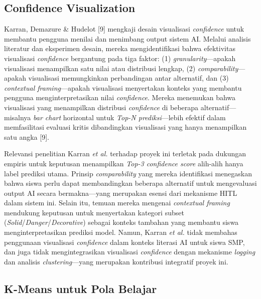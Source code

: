\documentclass[12pt,oneside]{report}
\begin{document}
\subsection{Confidence Visualization}
\label{subsec:penelitian-confidence-vis}

Karran, Demazure \& Hudelot [9] mengkaji desain visualisasi \textit{confidence} untuk membantu pengguna menilai dan menimbang output sistem AI. Melalui analisis literatur dan eksperimen desain, mereka mengidentifikasi bahwa efektivitas visualisasi \textit{confidence} bergantung pada tiga faktor: (1) \textit{granularity}—apakah visualisasi menampilkan satu nilai atau distribusi lengkap, (2) \textit{comparability}—apakah visualisasi memungkinkan perbandingan antar alternatif, dan (3) \textit{contextual framing}—apakah visualisasi menyertakan konteks yang membantu pengguna menginterpretasikan nilai \textit{confidence}. Mereka menemukan bahwa visualisasi yang menampilkan distribusi \textit{confidence} di beberapa alternatif—misalnya \textit{bar chart} horizontal untuk \textit{Top-N prediksi}—lebih efektif dalam memfasilitasi evaluasi kritis dibandingkan visualisasi yang hanya menampilkan satu angka [9].

Relevansi penelitian Karran \textit{et al.} terhadap proyek ini terletak pada dukungan empiris untuk keputusan menampilkan \textit{Top-3 confidence score} alih-alih hanya label prediksi utama. Prinsip \textit{comparability} yang mereka identifikasi menegaskan bahwa siswa perlu dapat membandingkan beberapa alternatif untuk mengevaluasi output AI secara bermakna—yang merupakan esensi dari mekanisme HITL dalam sistem ini. Selain itu, temuan mereka mengenai \textit{contextual framing} mendukung keputusan untuk menyertakan kategori subset (\textit{Solid}/\textit{Danger}/\textit{Decorative}) sebagai konteks tambahan yang membantu siswa menginterpretasikan prediksi model. Namun, Karran \textit{et al.} tidak membahas penggunaan visualisasi \textit{confidence} dalam konteks literasi AI untuk siswa SMP, dan juga tidak mengintegrasikan visualisasi \textit{confidence} dengan mekanisme \textit{logging} dan analisis \textit{clustering}—yang merupakan kontribusi integratif proyek ini.

\subsection{K-Means untuk Pola Belajar}
\label{subsec:penelitian-kmeans}
\end{document}
